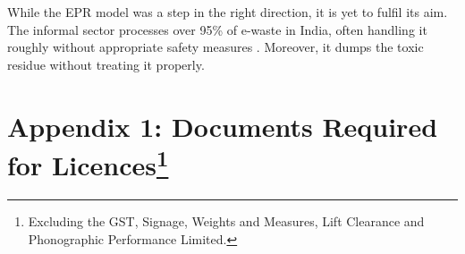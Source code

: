 \documentclass[a4paper, 12pt]{article}
\begin{document}
                                        While the EPR model was a step in the right direction, it is yet to fulfil its aim. The informal sector processes over 95\% of e-waste in India, often handling it roughly without appropriate safety measures \parencite{assochamstats}. Moreover, it dumps the toxic residue without treating it properly.\\ 
                    
                 
                          

	
	
	
	      
        
        \newpage      
             \section*{Appendix 1: Documents Required for Licences\footnote{Excluding the GST, Signage, Weights and Measures, Lift Clearance and Phonographic Performance Limited.}}
             \label {Appendix 1}
         
   
   
        
\end{document}
